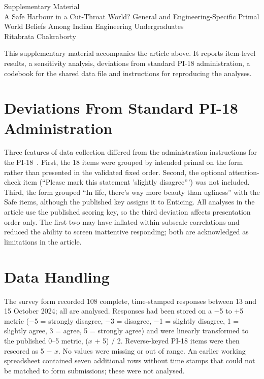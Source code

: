 \documentclass[journal,a4paper]{IEEEtran}
\begin{document}
\clearpage
\onecolumn
\makeatletter\setlength{\@fptop}{0pt}\makeatother
\setcounter{section}{0}\setcounter{table}{0}
\renewcommand{\thesection}{S\arabic{section}}\renewcommand{\theHsection}{supp.\arabic{section}}
\renewcommand{\thetable}{S\arabic{table}}\renewcommand{\theHtable}{supp.\arabic{table}}
\begin{center}
{\LARGE Supplementary Material}\\[6pt]
{\large A Safe Harbour in a Cut-Throat World? General and Engineering-Specific Primal World Beliefs Among Indian Engineering Undergraduates}\\[4pt]
{\normalsize Ritabrata Chakraborty}
\end{center}
\vspace{6pt}

\noindent This supplementary material accompanies the article above. It reports item-level results, a sensitivity analysis, deviations from standard PI-18 administration, a codebook for the shared data file and instructions for reproducing the analyses.

\section{Deviations From Standard PI-18 Administration}\label{sec:s1}

Three features of data collection differed from the administration instructions for the PI-18~\cite{cliftonyaden2021}. First, the 18 items were grouped by intended primal on the form rather than presented in the validated fixed order. Second, the optional attention-check item (``Please mark this statement 'slightly disagree''') was not included. Third, the form grouped ``In life, there's way more beauty than ugliness'' with the Safe items, although the published key assigns it to Enticing. All analyses in the article use the published scoring key, so the third deviation affects presentation order only. The first two may have inflated within-subscale correlations and reduced the ability to screen inattentive responding; both are acknowledged as limitations in the article.

\section{Data Handling}\label{sec:s2}

The survey form recorded 108 complete, time-stamped responses between 13 and 15 October 2024; all are analysed. Responses had been stored on a $-$5 to +5 metric ($-$5 = strongly disagree, $-$3 = disagree, $-$1 = slightly disagree, 1 = slightly agree, 3 = agree, 5 = strongly agree) and were linearly transformed to the published 0–5 metric, ($x$ + 5) / 2. Reverse-keyed PI-18 items were then rescored as 5 $-$ $x$. No values were missing or out of range. An earlier working spreadsheet contained seven additional rows without time stamps that could not be matched to form submissions; these were not analysed.
\end{document}
